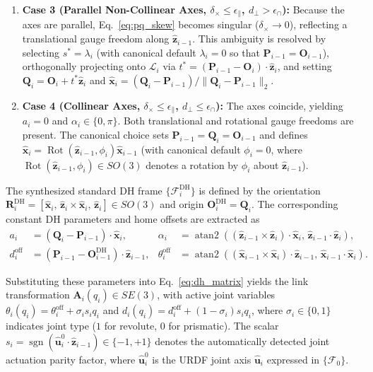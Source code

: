 \documentclass[fleqn,10pt]{article}
\begin{document}
\begin{enumerate}
	\item \textbf{Case 3 (Parallel Non-Collinear Axes, $\delta_\times\le\epsilon_\parallel$, $d_\perp>\epsilon_\cap$):} Because the axes are parallel, Eq.~\eqref{eq:pq_skew} becomes singular ($\delta_\times \to 0$), reflecting a translational gauge freedom along $\hat{\bm{z}}_{i-1}$. This ambiguity is resolved by selecting $s^*=\lambda_i$ (with canonical default $\lambda_i=0$ so that $\bm{P}_{i-1} = \bm{O}_{i-1}$), orthogonally projecting onto $\mathcal{L}_i$ via $t^* = (\bm{P}_{i-1} - \bm{O}_i) \cdot \hat{\bm{z}}_i$, and setting $\bm{Q}_i = \bm{O}_i + t^*\hat{\bm{z}}_i$ and $\hat{\bm{x}}_i = (\bm{Q}_i - \bm{P}_{i-1}) / \|\bm{Q}_i - \bm{P}_{i-1}\|_2$.
	
	\item \textbf{Case 4 (Collinear Axes, $\delta_\times\le\epsilon_\parallel$, $d_\perp\le\epsilon_\cap$):} The axes coincide, yielding $a_i=0$ and $\alpha_i\in\{0,\pi\}$. Both translational and rotational gauge freedoms are present. The canonical choice sets $\bm{P}_{i-1} = \bm{Q}_i = \bm{O}_{i-1}$ and defines $\hat{\bm{x}}_i = \operatorname{Rot}(\hat{\bm{z}}_{i-1}, \phi_i)\hat{\bm{x}}_{i-1}$ (with canonical default $\phi_i=0$, where $\operatorname{Rot}(\hat{\bm{z}}_{i-1}, \phi_i)\in SO(3)$ denotes a rotation by $\phi_i$ about $\hat{\bm{z}}_{i-1}$).
\end{enumerate}

The synthesized standard DH frame $\{\mathcal{F}_i^{\mathrm{DH}}\}$ is defined by the orientation $\bm{R}_i^{\mathrm{DH}} = [\hat{\bm{x}}_i, \, \hat{\bm{z}}_i \times \hat{\bm{x}}_i, \, \hat{\bm{z}}_i] \in SO(3)$ and origin $\bm{O}_i^{\mathrm{DH}}=\bm{Q}_i$. The corresponding constant DH parameters and home offsets are extracted as
\begin{align}
	a_i &= (\bm{Q}_i - \bm{P}_{i-1}) \cdot \hat{\bm{x}}_i, & \alpha_i &= \operatorname{atan2}\!\left( (\hat{\bm{z}}_{i-1} \times \hat{\bm{z}}_i) \cdot \hat{\bm{x}}_i, \, \hat{\bm{z}}_{i-1} \cdot \hat{\bm{z}}_i \right), \label{eq:dh_a_alpha} \\
	d_i^{\mathrm{off}} &= (\bm{P}_{i-1} - \bm{O}_{i-1}^{\mathrm{DH}}) \cdot \hat{\bm{z}}_{i-1}, & \theta_i^{\mathrm{off}} &= \operatorname{atan2}\!\left( (\hat{\bm{x}}_{i-1} \times \hat{\bm{x}}_i) \cdot \hat{\bm{z}}_{i-1}, \, \hat{\bm{x}}_{i-1} \cdot \hat{\bm{x}}_i \right). \label{eq:dh_d_theta}
\end{align}

Substituting these parameters into Eq.~\eqref{eq:dh_matrix} yields the link transformation $\bm{A}_i(q_i)\in SE(3)$, with active joint variables $\theta_i(q_i) = \theta_i^{\mathrm{off}} + \sigma_i s_i q_i$ and $d_i(q_i) = d_i^{\mathrm{off}} + (1-\sigma_i)s_i q_i$, where $\sigma_i \in \{0,1\}$ indicates joint type ($1$ for revolute, $0$ for prismatic). The scalar $s_i = \operatorname{sgn}(\hat{\bm{u}}_i^0 \cdot \hat{\bm{z}}_{i-1}) \in \{-1,+1\}$ denotes the automatically detected joint actuation parity factor, where $\hat{\bm{u}}_i^0$ is the URDF joint axis $\hat{\bm{u}}_i$ expressed in $\{\mathcal{F}_0\}$.
\end{document}
